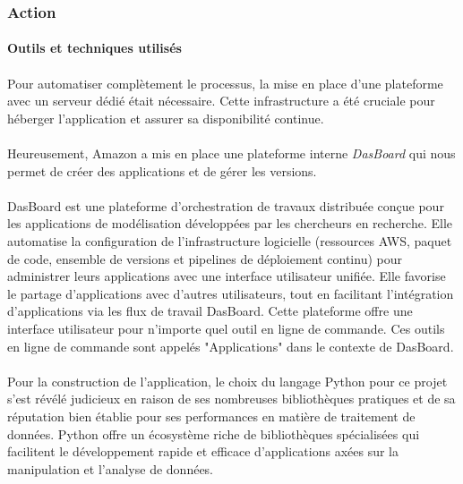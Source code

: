 \subsubsection{Action}

\paragraph{}
\vspace{-2em}
{\large\textbf{{Outils et techniques utilisés}}}

\paragraph{}
\vspace{-2em}
Pour automatiser complètement le processus, la mise en place d'une plateforme avec un serveur dédié était nécessaire. Cette infrastructure a été cruciale pour héberger l'application et assurer sa disponibilité continue. 
\paragraph{}
\vspace{-2em}
Heureusement, Amazon a mis en place une plateforme interne \textit{DasBoard} qui nous permet de créer des applications et de gérer les versions.

\paragraph{}
\vspace{-2em}
DasBoard est une plateforme d'orchestration de travaux distribuée conçue pour les applications de modélisation développées par les chercheurs en recherche. Elle automatise la configuration de l'infrastructure logicielle (ressources AWS, paquet de code, ensemble de versions et pipelines de déploiement continu) pour administrer leurs applications avec une interface utilisateur unifiée. Elle favorise le partage d'applications avec d'autres utilisateurs, tout en facilitant l'intégration d'applications via les flux de travail DasBoard. Cette plateforme offre une interface utilisateur pour n'importe quel outil en ligne de commande. Ces outils en ligne de commande sont appelés "Applications" dans le contexte de DasBoard.

\paragraph{}
\vspace{-2em}
Pour la construction de l'application, le choix du langage Python pour ce projet s'est révélé judicieux en raison de ses nombreuses bibliothèques pratiques et de sa réputation bien établie pour ses performances en matière de traitement de données. Python offre un écosystème riche de bibliothèques spécialisées qui facilitent le développement rapide et efficace d'applications axées sur la manipulation et l'analyse de données. 

